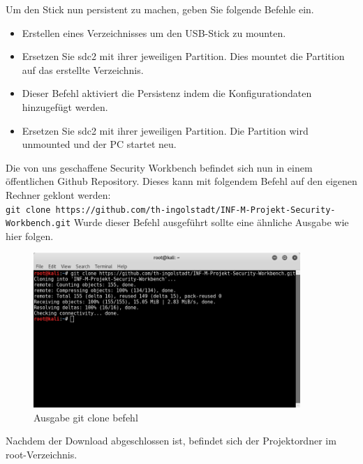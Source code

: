 Um den Stick nun persistent zu machen, geben Sie folgende Befehle ein.
\begin{itemize}
	\item {} Erstellen eines Verzeichnisses um den USB-Stick zu mounten.
	\item {} Ersetzen Sie sdc2 mit ihrer jeweiligen Partition. Dies mountet die Partition auf das erstellte Verzeichnis.
	\item {} Dieser Befehl aktiviert die Persistenz indem die Konfigurationdaten hinzugefügt werden.
	\item {}  Ersetzen Sie sdc2 mit ihrer jeweiligen Partition. Die Partition wird unmounted und der PC startet neu.
\end{itemize}

Die von uns geschaffene Security Workbench befindet sich nun in einem öffentlichen Github Repository. Dieses kann mit folgendem Befehl auf den eigenen Rechner geklont werden:\\
\colorbox{altgray}{\lstinline|git clone https://github.com/th-ingolstadt/INF-M-Projekt-Security-Workbench.git|}
Wurde dieser Befehl ausgeführt sollte eine ähnliche Ausgabe wie hier folgen.

	\begin{figure}[H]
		\centering
		\includegraphics[width=0.9\textwidth]{images/prep/git_clone.png}
		\caption{Ausgabe git clone befehl}
		\label{fig:git clone output}
	\end{figure}
Nachdem der Download abgeschlossen ist, befindet sich der Projektordner im root-Verzeichnis.

